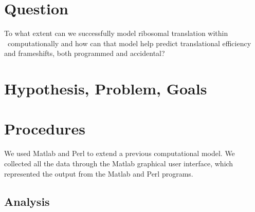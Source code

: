 \documentclass[twocolumn, article, oneside]{memoir}
\author{\BWFauthors}
\title{\BWFtitle{\emph}}
\begin{document}
\section{Question}
To what extent can we successfully model ribosomal translation within
\ecoli\ computationally and how can that model help predict
translational efficiency and frameshifts, both programmed and
accidental?

\section{Hypothesis, Problem, Goals}

\section{Procedures}
We used Matlab and Perl to extend a previous computational model. We
collected all the data through the Matlab graphical user interface,
which represented the output from the Matlab and Perl programs.

\subsection{Analysis}

{}

\end{document}
